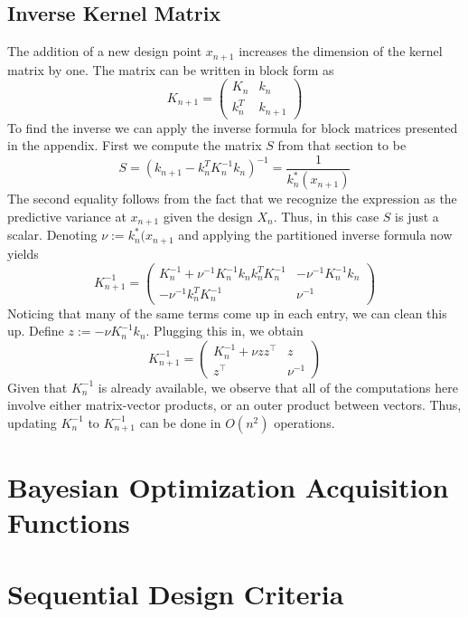 \documentclass[12pt]{article}
\begin{document}
\subsection{Inverse Kernel Matrix}
The addition of a new design point $x_{n+1}$ increases the dimension of the kernel matrix by one. The matrix can be written in block 
form as 
\[K_{n+1} = \begin{pmatrix} K_n & k_n \\ k_n^T & k_{n+1} \end{pmatrix}\]
To find the inverse we can apply the inverse formula for block matrices presented in the appendix. First we compute the matrix $S$ from 
that section to be
\[S = \left(k_{n+1} - k_n^T K_n^{-1} k_n\right)^{-1} = \frac{1}{k^*_{n}(x_{n+1})}\]
The second equality follows from the fact that we recognize the expression as the predictive variance at $x_{n+1}$ given the design $X_n$. Thus, in this 
case $S$ is just a scalar. Denoting $\nu := k^*_{n}(x_{n+1}$ and applying the partitioned inverse formula now yields 
\[
K_{n+1}^{-1} = \begin{pmatrix} K_n^{-1} + \nu^{-1} K_n^{-1} k_n k_n^T K_n^{-1} & -\nu^{-1} K_n^{-1}k_n \\
-\nu^{-1} k_n^T K_n^{-1} & \nu^{-1} \end{pmatrix}
\]
Noticing that many of the same terms come up in each entry, we can clean this up. Define
$z := -\nu K_n^{-1} k_n$. Plugging this in, we obtain 
\[
K_{n+1}^{-1} = \begin{pmatrix} K_n^{-1} + \nu zz^\top & z \\ z^\top & \nu^{-1} \end{pmatrix}
\]
Given that $K_n^{-1}$ is already available, we observe that all of the computations here involve either matrix-vector products, or an outer 
product between vectors. Thus, updating $K_n^{-1}$ to $K_{n+1}^{-1}$ can be done in $O(n^2)$ operations. 

\section{Bayesian Optimization Acquisition Functions}

\section{Sequential Design Criteria}
\end{document}

